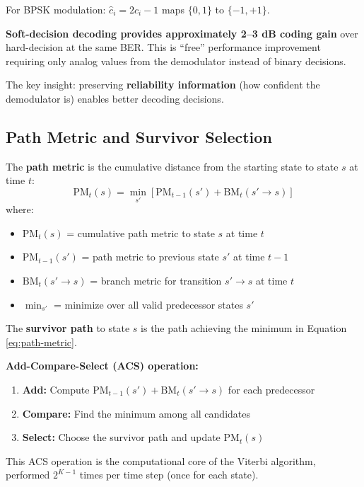 For BPSK modulation: $\hat{c}_i = 2c_i - 1$ maps $\{0,1\}$ to $\{-1,+1\}$.

\begin{keyconcept}
\textbf{Soft-decision decoding provides approximately 2--3 dB coding gain} over hard-decision at the same BER. This is ``free'' performance improvement requiring only analog values from the demodulator instead of binary decisions.

The key insight: preserving \textbf{reliability information} (how confident the demodulator is) enables better decoding decisions.
\end{keyconcept}

\subsection{Path Metric and Survivor Selection}

The \textbf{path metric} is the cumulative distance from the starting state to state $s$ at time $t$:
\begin{equation}
\text{PM}_t(s) = \min_{s'} \left[ \text{PM}_{t-1}(s') + \text{BM}_t(s' \to s) \right]
\label{eq:path-metric}
\end{equation}
where:
\begin{itemize}
\item $\text{PM}_t(s)$ = cumulative path metric to state $s$ at time $t$
\item $\text{PM}_{t-1}(s')$ = path metric to previous state $s'$ at time $t-1$
\item $\text{BM}_t(s' \to s)$ = branch metric for transition $s' \to s$ at time $t$
\item $\min_{s'}$ = minimize over all valid predecessor states $s'$
\end{itemize}

The \textbf{survivor path} to state $s$ is the path achieving the minimum in Equation \ref{eq:path-metric}.

\textbf{Add-Compare-Select (ACS) operation:}
\begin{enumerate}
\item \textbf{Add:} Compute $\text{PM}_{t-1}(s') + \text{BM}_t(s' \to s)$ for each predecessor
\item \textbf{Compare:} Find the minimum among all candidates
\item \textbf{Select:} Choose the survivor path and update $\text{PM}_t(s)$
\end{enumerate}

This ACS operation is the computational core of the Viterbi algorithm, performed $2^{K-1}$ times per time step (once for each state).


